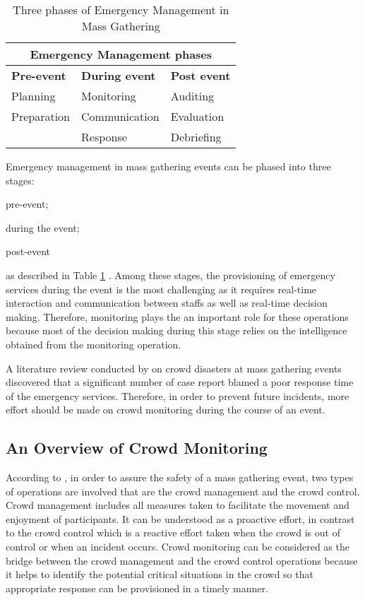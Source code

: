 \begin{table}[!htbp]
	\caption{Three phases of Emergency Management in Mass Gathering}
	\label{table:phaseOfEm}
	\centering
	\begin{tabular}{|p{3cm}|p{3cm}|p{3cm}|}
		\hline
		\multicolumn{3}{|c|}{\textbf{Emergency Management phases}} \\ \hline \hline
		\textbf{Pre-event} & \textbf{During event} & \textbf{Post event} \\	\hline
		Planning & Monitoring  & Auditing  \\
		Preparation & Communication & Evaluation \\
		& Response & Debriefing \\
		\hline
	\end{tabular}
\end{table}

Emergency management in mass gathering events can be phased into three stages: 
\begin{inparaenum}[i)]
	\item pre-event;
	\item during the event;
	\item post-event
\end{inparaenum} as described in Table \ref{table:phaseOfEm} \citep{DelirHaghighi2013}. Among these stages, the provisioning of emergency services during the event is the most challenging as it requires real-time interaction and communication between staffs as well as real-time decision making. Therefore, monitoring plays the an important role for these operations because most of the decision making during this stage relies on the intelligence obtained from the monitoring operation. 

A literature review conducted by \citet{Soomaroo2012} on crowd disasters at mass gathering events discovered that a significant number of case report blamed a poor response time of the emergency services. Therefore, in order to prevent future incidents, more effort should be made on crowd monitoring during the course of an event. 

\subsection{An Overview of Crowd Monitoring}

According to \citet{Berlonghi1995}, in order to assure the safety of a mass gathering event, two types of operations are involved that are the crowd management and the crowd control. Crowd management includes all measures taken to facilitate the movement and enjoyment of participants. It can be understood as a proactive effort, in contrast to the crowd control which is a reactive effort taken when the crowd is out of control or when an incident occurs. Crowd monitoring can be considered as the bridge between the crowd management and the crowd control operations because it helps to identify the potential critical situations in the crowd so that appropriate response can be provisioned in a timely manner.

